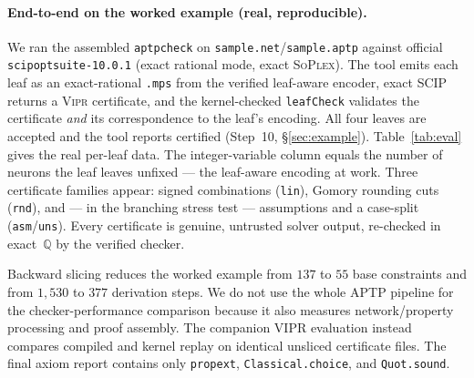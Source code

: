 \documentclass[runningheads]{llncs}
\newcommand{\Q}{\mathbb{Q}}
\newcommand{\vipr}{\textsc{Vipr}}
\newcommand{\scip}{\textsc{SCIP}}
\newcommand{\sound}{\textsf{certified}}
\newcommand{\code}[1]{\texttt{#1}}
\begin{document}
\paragraph{End-to-end on the worked example (real, reproducible).} We ran the
assembled \code{aptpcheck} on \code{sample.net}/\code{sample.aptp} against official
\code{scipoptsuite-10.0.1} (exact rational mode, exact \textsc{SoPlex}). The tool emits
each leaf as an exact-rational \code{.mps} from the verified leaf-aware encoder, exact
\scip{} returns a \vipr{} certificate, and the kernel-checked \code{leafCheck} validates
the certificate \emph{and} its correspondence to the leaf's encoding. All four leaves
are accepted and the tool reports \sound{} (Step~10, \S\ref{sec:example}).
Table~\ref{tab:eval} gives the real per-leaf data. The integer-variable column equals
the number of neurons the leaf leaves unfixed --- the leaf-aware encoding at work. Three
certificate families appear: signed combinations (\code{lin}), Gomory rounding cuts
(\code{rnd}), and --- in the branching stress test --- assumptions and a case-split
(\code{asm}/\code{uns}). Every certificate is genuine, untrusted solver output, re-checked
in exact~$\Q$ by the verified checker.

Backward slicing reduces the worked example from $137$ to $55$ base constraints
and from $1{,}530$ to $377$ derivation steps. We do not use the whole APTP pipeline
for the checker-performance comparison because it also measures network/property
processing and proof assembly. The companion VIPR evaluation instead compares
compiled and kernel replay on identical unsliced certificate files. The final
axiom report contains only \code{propext}, \code{Classical.choice}, and
\code{Quot.sound}.
\end{document}
